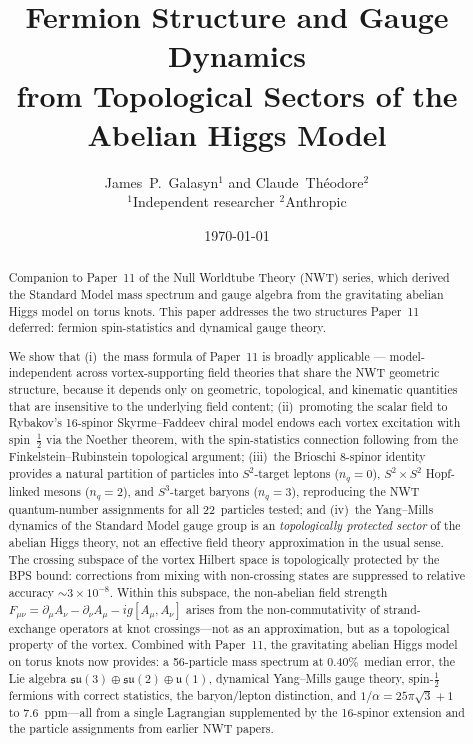 \documentclass[11pt]{article}
\newcommand{\su}{\mathfrak{su}}
\newcommand{\uu}{\mathfrak{u}}
\newcommand{\half}{\tfrac{1}{2}}
\begin{document}
\title{Fermion Structure and Gauge Dynamics\\
from Topological Sectors of the Abelian Higgs Model}

\author{James~P.~Galasyn$^1$ and Claude~Th\'eodore$^2$\\
\small $^1$Independent researcher \quad $^2$Anthropic}

\date{\today}

\maketitle

\begin{abstract}
Companion to Paper~11 of the Null Worldtube Theory (NWT) series, which
derived the Standard Model mass spectrum and gauge algebra from the
gravitating abelian Higgs model on torus knots.  This paper addresses
the two structures Paper~11 deferred: fermion spin-statistics and
dynamical gauge theory.

We show that (i)~the mass formula of Paper~11 is broadly applicable ---
model-independent across vortex-supporting field theories that
share the NWT geometric structure, because
it depends only on geometric, topological, and kinematic quantities that
are insensitive to the underlying field content; (ii)~promoting the
scalar field to Rybakov's 16-spinor Skyrme--Faddeev chiral model
endows each vortex excitation with spin~$\half$ via the Noether theorem,
with the spin-statistics connection following from the
Finkelstein--Rubinstein topological argument; (iii)~the Brioschi
8-spinor identity provides a natural partition of particles into
$S^2$-target leptons ($n_q = 0$), $S^2 \times S^2$ Hopf-linked mesons
($n_q = 2$), and $S^3$-target baryons ($n_q = 3$), reproducing the
NWT quantum-number assignments for all 22~particles tested; and
(iv)~the Yang--Mills dynamics of the Standard Model gauge group is an
\emph{topologically protected sector} of the abelian Higgs theory,
not an effective field theory approximation in the usual sense.  The crossing subspace of the vortex Hilbert space is
topologically protected by the BPS bound: corrections from mixing with
non-crossing states are suppressed to relative accuracy
$\sim 3 \times 10^{-8}$.  Within this subspace, the non-abelian field
strength $F_{\mu\nu} = \partial_\mu A_\nu - \partial_\nu A_\mu -
ig[A_\mu, A_\nu]$ arises from the non-commutativity of strand-exchange
operators at knot crossings---not as an approximation, but as a
topological property of the vortex.  Combined with Paper~11, the
gravitating abelian Higgs model on torus knots now provides: a
56-particle mass spectrum at 0.40\%~median error, the Lie algebra
$\su(3) \oplus \su(2) \oplus \uu(1)$, dynamical Yang--Mills gauge
theory, spin-$\half$ fermions with correct statistics, the
baryon/lepton distinction, and $1/\alpha = 25\pi\sqrt{3} + 1$ to
7.6~ppm---all from a single Lagrangian supplemented by the 16-spinor
extension and the particle assignments from earlier NWT
papers.
\end{abstract}
\end{document}
